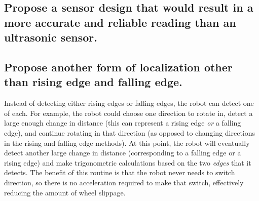 \documentclass[11pt]{article}
\begin{document}
\subsection{Propose a sensor design that would result in a more accurate and reliable reading than
an ultrasonic sensor.}

\subsection{Propose another form of localization other than rising edge and falling edge.}
\par Instead of detecting either rising edges or falling edges, the robot can detect one of each. For
example, the robot could choose one direction to rotate in, detect a large enough change in distance
(this can represent a rising edge \textit{or} a falling edge), and continue rotating in that
direction (as opposed to changing directions in the rising and falling edge methods). At this point,
the robot will eventually detect another large change in distance (corresponding to a falling edge
or a rising edge) and make trigonometric calculations based on the two \textit{edges} that it
detects. The benefit of this routine is that the robot never needs to switch direction, so there is
no acceleration required to make that switch, effectively reducing the amount of wheel slippage.
\end{document}

